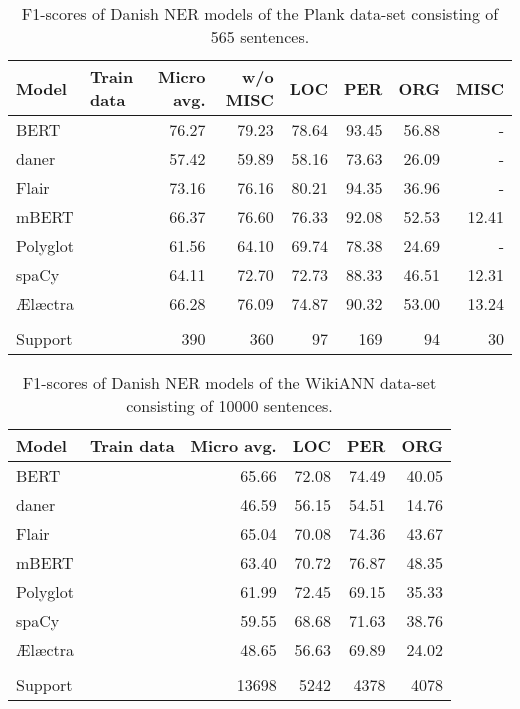 \documentclass[main.tex]{subfiles}
\begin{document}
\begin{table}
	\begin{center}
		\begin{tabular}{l l r r r r r r}
			Model & Train data & Micro avg. & w/o MISC & LOC & PER & ORG & MISC \\
			\hline
			BERT &  & 76.27 & 79.23 & 78.64 & 93.45 & 56.88 & - \\
			daner &  & 57.42 & 59.89 & 58.16 & 73.63 & 26.09 & - \\
			Flair &  & 73.16 & 76.16 & 80.21 & 94.35 & 36.96 & - \\
			mBERT &  & 66.37 & 76.60 & 76.33 & 92.08 & 52.53 & 12.41 \\
			Polyglot &  & 61.56 & 64.10 & 69.74 & 78.38 & 24.69 & - \\
			spaCy &  & 64.11 & 72.70 & 72.73 & 88.33 & 46.51 & 12.31 \\
			Ælæctra &  & 66.28 & 76.09 & 74.87 & 90.32 & 53.00 & 13.24 \\
			 &  &  &  &  &  &  &  \\
			Support &  & 390 & 360 & 97 & 169 & 94 & 30 \\
		\end{tabular}
	\end{center}
	\caption{F1\pro-scores of Danish NER models of the Plank data-set consisting of 565 sentences.}
	\label{tab:Plank}
\end{table}

\begin{table}
	\begin{center}
		\begin{tabular}{l l r r r r}
			Model & Train data & Micro avg. & LOC & PER & ORG \\
			\hline
			BERT &  & 65.66 & 72.08 & 74.49 & 40.05 \\
			daner &  & 46.59 & 56.15 & 54.51 & 14.76 \\
			Flair &  & 65.04 & 70.08 & 74.36 & 43.67 \\
			mBERT &  & 63.40 & 70.72 & 76.87 & 48.35 \\
			Polyglot &  & 61.99 & 72.45 & 69.15 & 35.33 \\
			spaCy &  & 59.55 & 68.68 & 71.63 & 38.76 \\
			Ælæctra &  & 48.65 & 56.63 & 69.89 & 24.02 \\
			 &  &  &  &  &  \\
			Support &  & 13698 & 5242 & 4378 & 4078 \\
		\end{tabular}
	\end{center}
	\caption{F1\pro-scores of Danish NER models of the WikiANN data-set consisting of 10000 sentences.}
	\label{tab:WikiANN}
\end{table}
\end{document}
